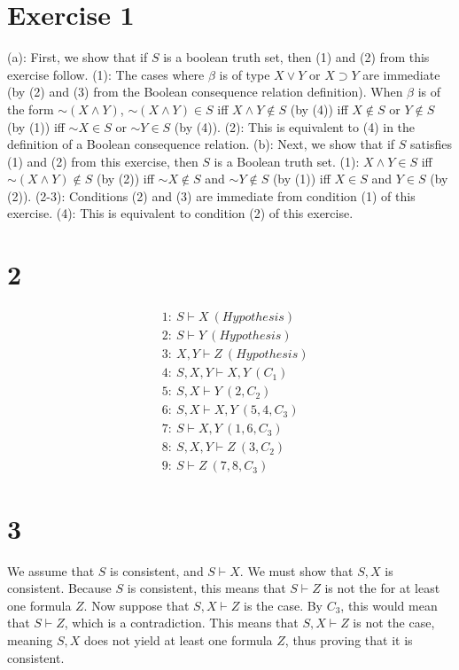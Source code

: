 \documentclass{article}
\newcommand*{\oldneg}{\mathord{\sim}}
\theoremstyle{definition}
\begin{document}
\section*{Exercise 1}
(a): First, we show that if $S$ is a boolean truth set, then (1) and (2) from this exercise follow.\newline
(1): The cases where $\beta$ is of type $X\vee Y$ or $X\supset Y$ are immediate (by (2) and (3) from the Boolean consequence relation definition). 
When $\beta$ is of the form $\oldneg(X\wedge Y)$, $\oldneg(X\wedge Y)\in S$ iff $X\wedge Y\notin S$ (by (4)) iff $X\notin S$ or $Y\notin S$ (by (1)) 
iff $\oldneg X\in S$ or $\oldneg Y\in S$ (by (4)).\newline
(2): This is equivalent to (4) in the definition of a Boolean consequence relation.\newline
(b): Next, we show that if $S$ satisfies (1) and (2) from this exercise, then $S$ is a Boolean truth set.
(1): $X\wedge Y\in S$ iff $\oldneg(X\wedge Y)\notin S$ (by (2)) iff $\oldneg X\notin S$ and $\oldneg Y\notin S$ (by (1)) iff $X\in S$ and $Y\in S$ (by 
(2)).\newline
(2-3): Conditions (2) and (3) are immediate from condition (1) of this exercise. 
(4): This is equivalent to condition (2) of this exercise.

\section*{2}
\[
\begin{array}{rl}
	& 1:\ S\vdash X\ (Hypothesis) \\
	& 2:\ S\vdash Y\ (Hypothesis) \\
	& 3:\ X,Y\vdash Z\ (Hypothesis) \\
	& 4:\ S,X,Y\vdash X,Y\ (C_1) \\
	& 5:\ S,X\vdash Y\ (2,C_2) \\
	& 6:\ S,X\vdash X,Y\ (5,4,C_3) \\
	& 7:\ S\vdash X,Y\ (1,6,C_3) \\
	& 8:\ S,X,Y\vdash Z\ (3,C_2) \\
	& 9:\ S\vdash Z\ (7,8,C_3)
\end{array}
\]

\section*{3}
We assume that $S$ is consistent, and $S\vdash X$. We must show that $S,X$ is consistent. Because $S$ is consistent, this means that $S\vdash Z$ is not the 
for at least one formula $Z$. Now suppose that $S,X\vdash Z$ is the case. By $C_3$, this would mean that $S\vdash Z$, which is a contradiction. This means 
that $S,X\vdash Z$ is not the case, meaning $S,X$ does not yield at least one formula $Z$, thus proving that it is consistent.
\end{document}
